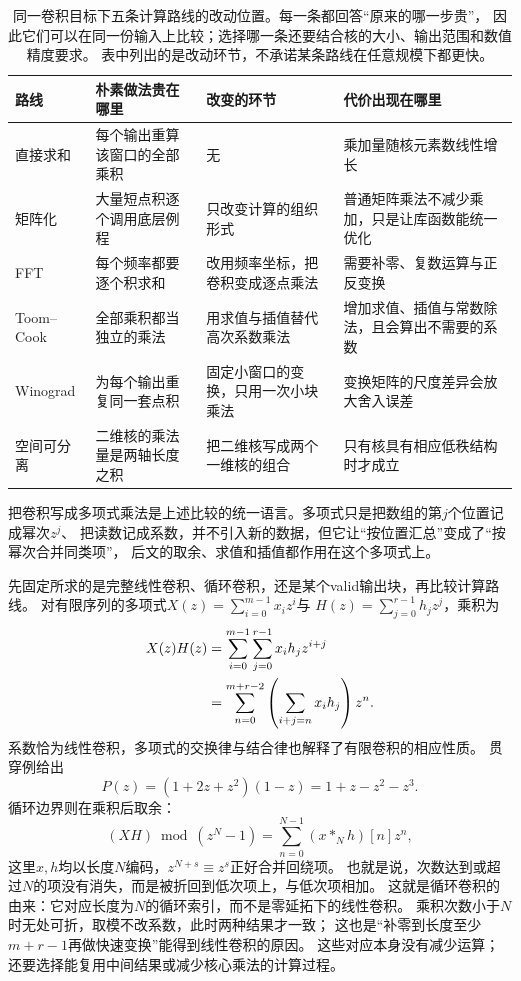 \begin{table}[htbp]
  \centering
  \begin{tabularx}{\linewidth}{@{}lXXX@{}}
    \toprule
    路线 & 朴素做法贵在哪里 & 改变的环节 & 代价出现在哪里\\
    \midrule
    直接求和 & 每个输出重算该窗口的全部乘积 & 无 & 乘加量随核元素数线性增长\\
    矩阵化 & 大量短点积逐个调用底层例程 & 只改变计算的组织形式 & 普通矩阵乘法不减少乘加，只是让库函数能统一优化\\
    FFT & 每个频率都要逐个积求和 & 改用频率坐标，把卷积变成逐点乘法 & 需要补零、复数运算与正反变换\\
    Toom--Cook & 全部乘积都当独立的乘法 & 用求值与插值替代高次系数乘法 & 增加求值、插值与常数除法，且会算出不需要的系数\\
    Winograd & 为每个输出重复同一套点积 & 固定小窗口的变换，只用一次小块乘法 & 变换矩阵的尺度差异会放大舍入误差\\
    空间可分离 & 二维核的乘法量是两轴长度之积 & 把二维核写成两个一维核的组合 & 只有核具有相应低秩结构时才成立\\
    \bottomrule
  \end{tabularx}
  \caption{同一卷积目标下五条计算路线的改动位置。每一条都回答“原来的哪一步贵”，
  因此它们可以在同一份输入上比较；选择哪一条还要结合核的大小、输出范围和数值精度要求。
  表中列出的是改动环节，不承诺某条路线在任意规模下都更快。}
  \label{tab:signal-analysis-fast-transform-roadmap}
\end{table}

把卷积写成多项式乘法是上述比较的统一语言。多项式只是把数组的第$j$个位置记成幂次$z^j$、
把读数记成系数，并不引入新的数据，但它让“按位置汇总”变成了“按幂次合并同类项”，
后文的取余、求值和插值都作用在这个多项式上。

先固定所求的是完整线性卷积、循环卷积，还是某个valid输出块，再比较计算路线。
对有限序列的多项式$X(z)=\sum_{i=0}^{m-1}x_i z^i$与
$H(z)=\sum_{j=0}^{r-1}h_jz^j$，乘积为
\begin{align}
  X(z)H(z)
  &=\sum_{i=0}^{m-1}\sum_{j=0}^{r-1}x_i h_jz^{i+j}\notag\\
  &=\sum_{n=0}^{m+r-2}\left(\sum_{i+j=n}x_i h_j\right)z^n.
  \label{eq:signal-analysis-polynomial-convolution}
\end{align}
系数恰为线性卷积，多项式的交换律与结合律也解释了有限卷积的相应性质。
贯穿例给出
\begin{equation}
  P(z)=(1+2z+z^2)(1-z)=1+z-z^2-z^3.
  \label{eq:signal-analysis-running-polynomial-product}
\end{equation}
循环边界则在乘积后取余：
\begin{equation}
  (XH)\bmod(z^N-1)=\sum_{n=0}^{N-1}(x*_Nh)[n]z^n,
  \label{eq:signal-analysis-polynomial-circular-convolution}
\end{equation}
这里$x,h$均以长度$N$编码，$z^{N+s}\equiv z^s$正好合并回绕项。
也就是说，次数达到或超过$N$的项没有消失，而是被折回到低次项上，与低次项相加。
这就是循环卷积的由来：它对应长度为$N$的循环索引，而不是零延拓下的线性卷积。
乘积次数小于$N$时无处可折，取模不改系数，此时两种结果才一致；
这也是“补零到长度至少$m+r-1$再做快速变换”能得到线性卷积的原因。
这些对应本身没有减少运算；还要选择能复用中间结果或减少核心乘法的计算过程。

